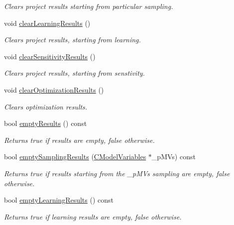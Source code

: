 \begin{DoxyCompactItemize}
\begin{DoxyCompactList}\small\item\em Clears project results starting from particular sampling. \end{DoxyCompactList}\item 
void \hyperlink{class_go_s_u_m_1_1_c_container_a1754c019da5d002894dc19824edb1137}{clear\-Learning\-Results} ()
\begin{DoxyCompactList}\small\item\em Clears project results, starting from learning. \end{DoxyCompactList}\item 
void \hyperlink{class_go_s_u_m_1_1_c_container_a9be3f3f67a48964c4f92b754b72719bf}{clear\-Sensitivity\-Results} ()
\begin{DoxyCompactList}\small\item\em Clears project results, starting from senstivity. \end{DoxyCompactList}\item 
void \hyperlink{class_go_s_u_m_1_1_c_container_a2bca712ba776fbd4a9149c489fe522fc}{clear\-Optimization\-Results} ()
\begin{DoxyCompactList}\small\item\em Clears optimization results. \end{DoxyCompactList}\item 
bool \hyperlink{class_go_s_u_m_1_1_c_container_ad46f5c3477a65e6ecaab12b29b66630a}{empty\-Results} () const 
\begin{DoxyCompactList}\small\item\em Returns true if results are empty, false otherwise. \end{DoxyCompactList}\item 
bool \hyperlink{class_go_s_u_m_1_1_c_container_a931b4dec67d7370b5c862a12339b14df}{empty\-Sampling\-Results} (\hyperlink{class_go_s_u_m_1_1_c_model_variables}{C\-Model\-Variables} $\ast$\-\_\-p\-M\-Vs) const 
\begin{DoxyCompactList}\small\item\em Returns true if results starting from the \-\_\-p\-M\-Vs sampling are empty, false otherwise. \end{DoxyCompactList}\item 
bool \hyperlink{class_go_s_u_m_1_1_c_container_a2df1d404b0fb5583dfbdcf26d51c6d5f}{empty\-Learning\-Results} () const 
\begin{DoxyCompactList}\small\item\em Returns true if learning results are empty, false otherwise. \end{DoxyCompactList}\item 

\end{DoxyCompactItemize}
